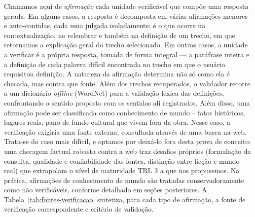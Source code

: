 Chamamos aqui de \textit{afirmação} cada unidade verificável que compõe uma resposta gerada. Em alguns casos, a resposta é decomposta em várias afirmações menores e auto-contidas, cada uma julgada isoladamente: é o que ocorre na contextualização, no relembrar e também na definição de um trecho, em que retornamos a explicação geral do trecho selecionado. Em outros casos, a unidade a verificar é a própria resposta, tomada de forma integral --- a paráfrase inteira e a definição de cada palavra difícil encontrada no trecho em que o usuário requisitou definição. A natureza da afirmação determina não só como ela é checada, mas contra que fonte. Além dos trechos recuperados, o validador recorre a um dicionário \textit{offline} (WordNet) para a validação léxica das definições, confrontando o sentido proposto com os sentidos ali registrados. Além disso, uma afirmação pode ser classificada como conhecimento de mundo -- fatos históricos, lugares reais, pano de fundo cultural que vivem fora da obra. Nesse caso, a verificação exigiria uma fonte externa, consultada através de uma busca na web. Trata-se do caso mais difícil, e optamos por deixá-lo fora desta prova de conceito: uma checagem factual robusta contra a web traz desafios próprios (formulação da consulta, qualidade e confiabilidade das fontes, distinção entre ficção e mundo real) que extrapolam o nível de maturidade TRL 3 a que nos propusemos. Na prática, afirmações de conhecimento de mundo são tratadas conservadoramente como não verificáveis, conforme detalhado em seções posteriores. A Tabela~\ref{tab:fontes-verificacao} sintetiza, para cada tipo de afirmação, a fonte de verificação correspondente e critério de validação.


